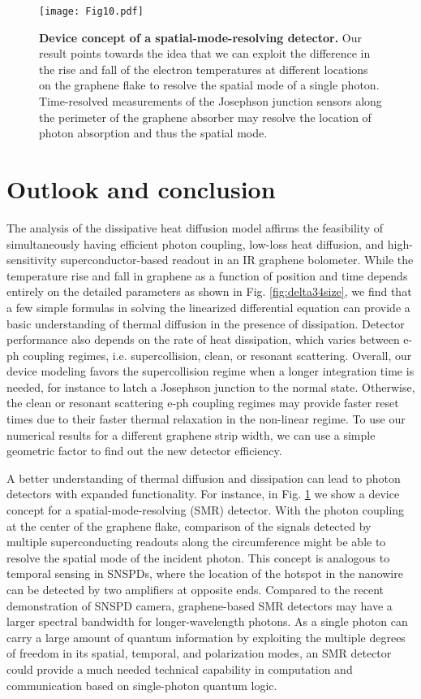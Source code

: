 \documentclass[aip, amsmath,amssymb, reprint]{revtex4-1}
\begin{document}
\begin{figure}[b]\centering
\texttt{[image: Fig10.pdf]}
\caption{\textbf{Device concept of a spatial-mode-resolving detector.} Our result points towards the idea that we can exploit the difference in the rise and fall of the electron temperatures at different locations on the graphene flake to resolve the spatial mode of a single photon. Time-resolved measurements of the Josephson junction sensors along the perimeter of the graphene absorber may resolve the location of photon absorption and thus the spatial mode.}
\label{fig:SpatialMode}
\end{figure}

\section{Outlook and conclusion}

The analysis of the dissipative heat diffusion model affirms the feasibility of simultaneously having efficient photon coupling, low-loss heat diffusion, and high-sensitivity superconductor-based readout in an IR graphene bolometer. While the temperature rise and fall in graphene as a function of position and time depends entirely on the detailed parameters as shown in Fig. \ref{fig:delta34size}, we find that a few simple formulas in solving the linearized differential equation can provide a basic understanding of thermal diffusion in the presence of dissipation. Detector performance also depends on the rate of heat dissipation, which varies between e-ph coupling regimes, i.e. supercollision, clean, or resonant scattering. Overall, our device modeling favors the supercollision regime when a longer integration time is needed, for instance to latch a Josephson junction to the normal state. Otherwise, the clean or resonant scattering e-ph coupling regimes may provide faster reset times due to their faster thermal relaxation in the non-linear regime. To use our numerical results for a different graphene strip width, we can use a simple geometric factor to find out the new detector efficiency.

A better understanding of thermal diffusion and dissipation can lead to photon detectors with expanded functionality. For instance, in Fig. \ref{fig:SpatialMode} we show a device concept for a spatial-mode-resolving (SMR) detector. With the photon coupling at the center of the graphene flake, comparison of the signals detected by multiple superconducting readouts along the circumference might be able to resolve the spatial mode of the incident photon. This concept is analogous to temporal sensing in SNSPDs, where the location of the hotspot in the nanowire can be detected by two amplifiers at opposite ends. Compared to the recent demonstration of SNSPD camera\cite{Oripov.2023}, graphene-based SMR detectors may have a larger spectral bandwidth for longer-wavelength photons. As a single photon can carry a large amount of quantum information by exploiting the multiple degrees of freedom in its spatial, temporal, and polarization modes, an SMR detector could provide a much needed technical capability in computation and communication based on single-photon quantum logic.
\end{document}
